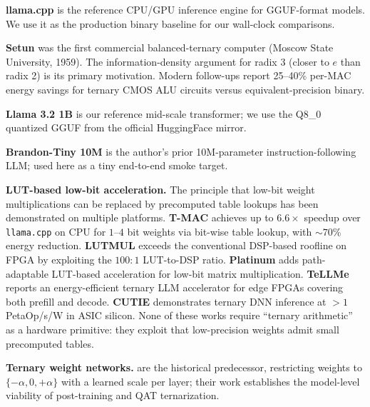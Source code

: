 \documentclass{article}
\begin{document}
\textbf{llama.cpp} \citep{llamacpp} is the reference {CPU}/{GPU}
inference engine for {GGUF}-format models. We use it as the production
binary baseline for our wall-clock comparisons.

\textbf{Setun} \citep{setun-1959} was the first commercial
balanced-ternary computer (Moscow State University, 1959). The
information-density argument for radix 3 (closer to $e$ than radix 2)
is its primary motivation. Modern follow-ups \citep{ternary-cmos-survey,
ternary-mac-energy} report 25--40\% per-MAC energy savings for
ternary {CMOS} {ALU} circuits versus equivalent-precision binary.

\textbf{Llama 3.2 1B} \citep{llama32-meta-2024} is our reference
mid-scale transformer; we use the Q8\_0 quantized {GGUF} from the
official {HuggingFace} mirror.

\textbf{Brandon-Tiny 10M} \citep{brandon-tiny-cortes} is the author's
prior 10M-parameter instruction-following {LLM}; used here as a tiny
end-to-end smoke target.

\textbf{{LUT}-based low-bit acceleration.} The principle that low-bit
weight multiplications can be replaced by precomputed table lookups
has been demonstrated on multiple platforms.
\textbf{T-MAC} \citep{tmac-eurosys-2025} achieves up to $6.6\times$
speedup over \texttt{llama.cpp} on {CPU} for $1$--$4$ bit weights via
bit-wise table lookup, with $\sim 70\%$ energy reduction.
\textbf{LUTMUL} \citep{lutmul-aspdac-2025} exceeds the conventional
{DSP}-based roofline on {FPGA} by exploiting the $100:1$ {LUT}-to-{DSP}
ratio. \textbf{Platinum} \citep{platinum-2025} adds path-adaptable
{LUT}-based acceleration for low-bit matrix multiplication.
\textbf{TeLLMe} \citep{tellme-2025} reports an energy-efficient
ternary {LLM} accelerator for edge {FPGA}s covering both prefill and
decode. \textbf{CUTIE} \citep{cutie-2020} demonstrates ternary {DNN}
inference at $> 1$ PetaOp/s/W in {ASIC} silicon. None of these works
require ``ternary arithmetic'' as a hardware primitive: they exploit
that low-precision weights admit small precomputed tables.

\textbf{Ternary weight networks.} \citet{ternary-weight-2016} are the
historical predecessor, restricting weights to $\{-\alpha, 0, +\alpha\}$
with a learned scale per layer; their work establishes the model-level
viability of post-training and {QAT} ternarization.
\end{document}
